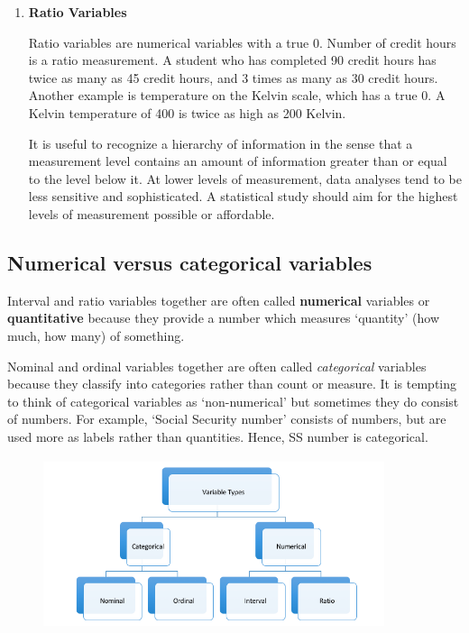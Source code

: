 \documentclass[11pt, chapterprefix=true]{scrbook}\usepackage[]{graphicx}\usepackage[]{color}
\begin{document}
\begin{enumerate}
\item \textbf{Ratio Variables}

Ratio variables are numerical variables with a true 0.  Number of credit hours is a ratio measurement.  A student who has completed 90 credit hours has twice as many as 45 credit hours, and 3 times as many as 30 credit hours.  Another example is temperature on the Kelvin scale, which has a true 0.  A Kelvin temperature of 400 is twice as high as 200 Kelvin.

It is useful to recognize a hierarchy of information in the sense that a measurement level contains an amount of information greater than or equal to the level below it.  At lower levels of measurement, data analyses tend to be less sensitive and sophisticated.  A statistical study should aim for the highest levels of measurement possible or affordable.
\end{enumerate}

\subsection{Numerical versus categorical variables}

Interval and ratio variables together are often called \textbf{numerical} variables or \textbf{quantitative} because they provide a number which measures `quantity' (how much, how many) of something.

Nominal and ordinal variables together are often called \textit{categorical} variables because they classify into categories rather than count or measure.  It is tempting to think of categorical variables as `non-numerical' but sometimes they do consist of numbers.  For example, `Social Security number' consists of numbers, but are used more as labels rather than quantities.  Hence, SS number is categorical.

\begin{figure}[htbp]
   \centering
   \includegraphics[width=10cm, height=5cm]
   {chapters/Chapter_2/ext_figure/varType.png} %

\end{figure}
\end{document}
